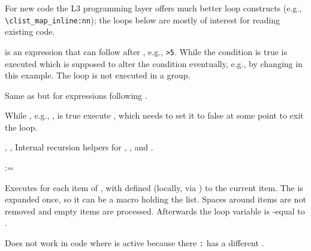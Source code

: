 \documentclass{l3in2edoc}
\begin{document}
For new code the L3 programming layer offers much better loop
constructs (e.g., \texttt{\textbackslash clist\_map\_inline:nn}); the
loops below are mostly of interest for reading existing code.

\begin{function}[]
  {
    \@whilenum
  }
  \begin{syntax}
       
  \end{syntax}
   is an expression that can follow
  after , e.g., \texttt{>5}. While the
  condition is true  is executed which is supposed to
  alter the condition eventually, e.g., by changing  in
  this example. The loop is not executed in a group.
\end{function}




\begin{function}[]
  {
    \@whiledim
  }
  \begin{syntax}
       
  \end{syntax}
  Same as  but for expressions following .
\end{function}



\begin{function}[]
  {
    \@whilesw
  }
  \begin{syntax}
       
  \end{syntax}
  While , e.g.,
  , is true execute , which needs to
  set it to false at some point to exit the loop.
\end{function}


\begin{function}[int]
  {
    \@iwhilenum,
    \@iwhiledim,
    \@iwhilesw
  }
  Internal recursion helpers for , , and
  .
\end{function}




\begin{function}[]
  {
    \@for
  }
  \begin{syntax}
      :=   
  \end{syntax}
  Executes  for each item of , with
   defined (locally, via ) to the current item. The
   is expanded once, so it can be a macro holding the
  list. Spaces around items are not removed and empty items are
  processed. Afterwards the loop variable is -equal to .

  Does not work in code where  is active because
  there \texttt{:} has a different .
\end{function}
\end{document}

